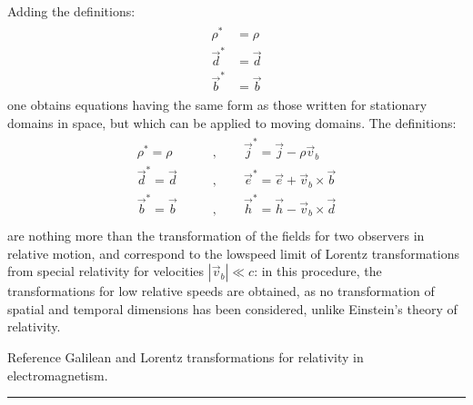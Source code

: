 \documentclass[letterpaper,10pt,english]{jupyterBook}
\begin{document}
\sphinxAtStartPar
Adding the definitions:
\begin{equation*}
\begin{split}\begin{aligned}
  \rho^*    &  = \rho  \\
  \vec{d}^* &  = \vec{d}  \\
  \vec{b}^* &  = \vec{b}
\end{aligned}\end{split}
\end{equation*}
\sphinxAtStartPar
one obtains equations having the same form as those written for stationary domains in space, but which can be applied to moving domains. The definitions:
\begin{equation*}
\begin{split}\begin{aligned}
\rho^* = \rho \qquad & , \qquad \vec{j}^* = \vec{j} - \rho \vec{v}_b \\
\vec{d}^* = \vec{d} \qquad & , \qquad \vec{e}^* = \vec{e} + \vec{v}_b \times \vec{b} \\
\vec{b}^* = \vec{b} \qquad & , \qquad \vec{h}^* = \vec{h} - \vec{v}_b \times \vec{d} \\
\end{aligned}\end{split}
\end{equation*}
\sphinxAtStartPar
are nothing more than the transformation of the fields for two observers in relative motion, and correspond to the low\sphinxhyphen{}speed limit of Lorentz transformations from special relativity for velocities \(|\vec{v}_b| \ll c\): in this procedure, the transformations for low relative speeds are obtained, as no transformation of spatial and temporal dimensions has been considered, unlike Einstein’s theory of relativity.

\sphinxAtStartPar
{} Reference Galilean and Lorentz transformations for relativity in electromagnetism.


\bigskip\hrule\bigskip


\sphinxstepscope
\end{document}
